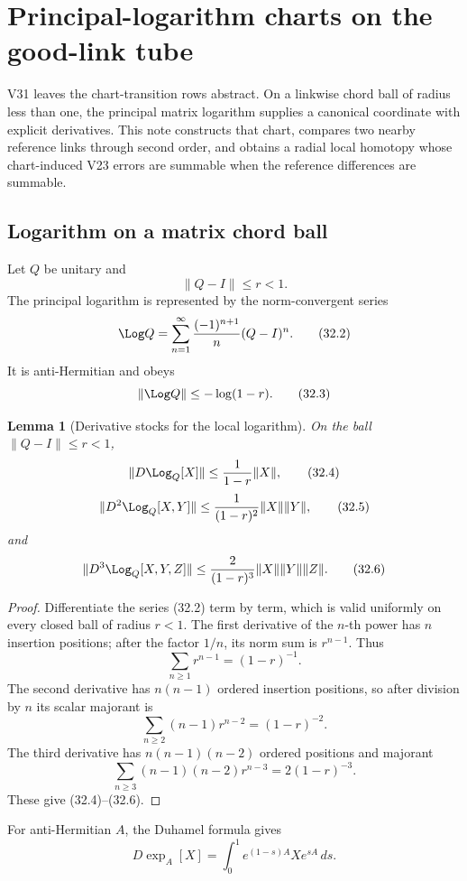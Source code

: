\documentclass[11pt]{article}
\newtheorem{lemma}[theorem]{Lemma}
\begin{document}
\section{Principal-logarithm charts on the good-link tube}
\label{sec:v11v32}

V31 leaves the chart-transition rows abstract.  On a linkwise chord ball
of radius less than one, the principal matrix logarithm supplies a
canonical coordinate with explicit derivatives.  This note constructs
that chart, compares two nearby reference links through second order,
and obtains a radial local homotopy whose chart-induced V23 errors are
summable when the reference differences are summable.

\subsection{Logarithm on a matrix chord ball}

Let \(Q\) be unitary and
\[
 \|Q-I\|\leq r<1.
 \tag{32.1}
\]
The principal logarithm is represented by the norm-convergent series
\[
 \Log Q
 =
 \sum_{n=1}^{\infty}\frac{(-1)^{n+1}}n(Q-I)^n.
 \tag{32.2}
\]
It is anti-Hermitian and obeys
\[
 \|\Log Q\|\leq-\log(1-r).
 \tag{32.3}
\]

\begin{lemma}[Derivative stocks for the local logarithm]
\label{lem:v11v32-log-stocks}
On the ball \(\|Q-I\|\leq r<1\),
\[
 \|D\Log_Q[X]\|
 \leq\frac1{1-r}\|X\|,
 \tag{32.4}
\]
\[
 \|D^2\Log_Q[X,Y]\|
 \leq\frac1{(1-r)^2}\|X\|\|Y\|,
 \tag{32.5}
\]
and
\[
 \|D^3\Log_Q[X,Y,Z]\|
 \leq\frac2{(1-r)^3}\|X\|\|Y\|\|Z\|.
 \tag{32.6}
\]
\end{lemma}

\begin{proof}
Differentiate the series (32.2) term by term, which is valid uniformly
on every closed ball of radius \(r<1\).  The first derivative of the
\(n\)-th power has \(n\) insertion positions; after the factor \(1/n\),
its norm sum is \(r^{n-1}\).  Thus
\[
 \sum_{n\geq1}r^{n-1}=(1-r)^{-1}.
\]
The second derivative has \(n(n-1)\) ordered insertion positions, so
after division by \(n\) its scalar majorant is
\[
 \sum_{n\geq2}(n-1)r^{n-2}=(1-r)^{-2}.
\]
The third derivative has \(n(n-1)(n-2)\) ordered positions and majorant
\[
 \sum_{n\geq3}(n-1)(n-2)r^{n-3}
 =2(1-r)^{-3}.
\]
These give (32.4)--(32.6).
\end{proof}

For anti-Hermitian \(A\), the Duhamel formula gives
\[
 D\exp_A[X]
 =
 \int_0^1e^{(1-s)A}Xe^{sA}\,ds.
 \tag{32.7}
\]
\end{document}
